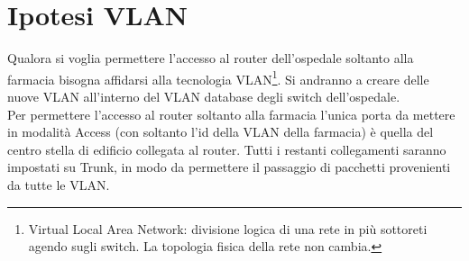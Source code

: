 \section{Ipotesi VLAN}
Qualora si voglia permettere l'accesso al router dell'ospedale soltanto alla farmacia bisogna affidarsi alla 
tecnologia VLAN\footnote{Virtual Local Area Network: divisione logica di una rete in più sottoreti agendo sugli 
switch. La topologia fisica della rete non cambia.}. Si andranno a creare delle nuove VLAN all'interno del VLAN 
database degli switch dell'ospedale. \\
\hspace{24pt}Per permettere l'accesso al router soltanto alla farmacia l'unica porta da mettere in modalità 
Access (con soltanto l'id della VLAN della farmacia) è quella del centro stella di edificio collegata al router. 
Tutti i restanti collegamenti saranno impostati su Trunk, in modo da permettere il passaggio di pacchetti provenienti 
da tutte le VLAN.
